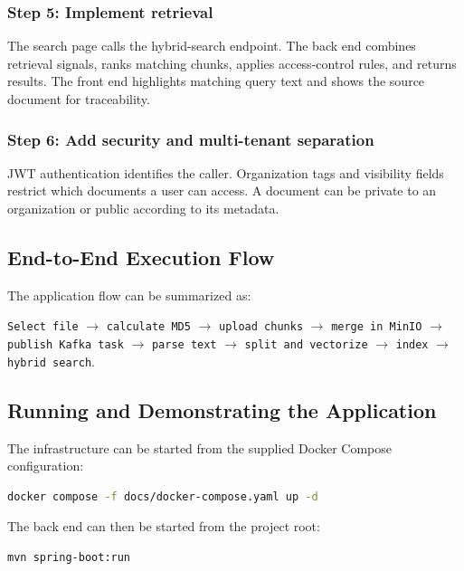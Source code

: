 \documentclass[11pt,a4paper]{article}
\begin{document}
\subsubsection{Step 5: Implement retrieval}

The search page calls the hybrid-search endpoint. The back end combines retrieval
signals, ranks matching chunks, applies access-control rules, and returns results. The
front end highlights matching query text and shows the source document for traceability.

\subsubsection{Step 6: Add security and multi-tenant separation}

JWT authentication identifies the caller. Organization tags and visibility fields
restrict which documents a user can access. A document can be private to an
organization or public according to its metadata.

\subsection{End-to-End Execution Flow}

The application flow can be summarized as:
\begin{center}
\texttt{Select file}
$\rightarrow$ \texttt{calculate MD5}
$\rightarrow$ \texttt{upload chunks}
$\rightarrow$ \texttt{merge in MinIO}
$\rightarrow$ \texttt{publish Kafka task}
$\rightarrow$ \texttt{parse text}
$\rightarrow$ \texttt{split and vectorize}
$\rightarrow$ \texttt{index}
$\rightarrow$ \texttt{hybrid search}.
\end{center}

\subsection{Running and Demonstrating the Application}

The infrastructure can be started from the supplied Docker Compose configuration:
\begin{lstlisting}[language=bash]
docker compose -f docs/docker-compose.yaml up -d
\end{lstlisting}

The back end can then be started from the project root:
\begin{lstlisting}[language=bash]
mvn spring-boot:run
\end{lstlisting}
\end{document}
